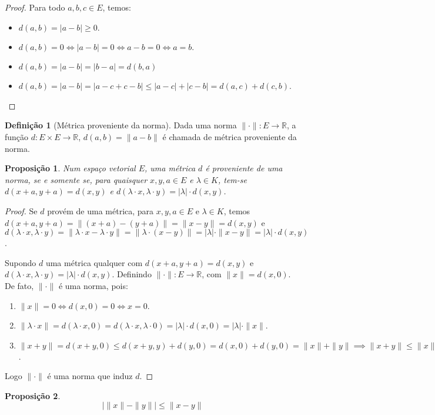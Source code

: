 \documentclass{article}
\theoremstyle{plain}
\newtheorem{prop}{Proposição}[section]
\theoremstyle{definition}
\newtheorem{definicao}{Definição}[section]
\theoremstyle{remark}
\begin{document}
\begin{proof}
	Para todo $a,b,c\in E$, temos:
	\begin{itemize}
		\item $d(a,b) = |a-b| \geq 0 $.
		\item $d(a,b) = 0 \iff |a-b| = 0 \iff a-b = 0 \iff a = b.$
		\item $d(a,b) = |a-b| = |b-a| = d(b,a)$
		\item $d(a,b) =  |a-b|  = |a-c+c-b| \leq |a-c| + |c-b| = d(a,c) + d(c,b)$.
	\end{itemize}
\end{proof}
\begin{definicao}[Métrica proveniente da norma]
	Dada uma norma $\| \cdot \|: E \to \mathbb{R}$, a função $d: E\times E \to \mathbb{R}$, $d(a,b) = \| a-b\|$ é chamada de métrica proveniente da norma.
\end{definicao}
\begin{prop}
	Num espaço vetorial $E$, uma métrica $d$ é proveniente de uma norma, se e somente se,  para quaisquer $x,y,a\in E$ e $\lambda\in K$, tem-se $d(x+a, y+a) = d(x,y)$ e $d(\lambda \cdot x, \lambda \cdot y ) = |\lambda| \cdot d(x,y)$.
\end{prop}
\begin{proof}
	Se $d$ provém de uma métrica, para $x,y, a\in E$ e $\lambda \in K$, temos  $d(x+a,y+a) = \|(x+a) -(y+a) \| = \| x- y\| = d(x,y)$ e $d(\lambda \cdot x, \lambda \cdot y ) = \| \lambda\cdot x  - \lambda \cdot y \| = \| \lambda\cdot (x-y) \| = |\lambda|\cdot \| x-y\| = |\lambda | \cdot d(x,y)$.

	Supondo $d$ uma métrica qualquer com $d(x+a, y+a) = d(x,y)$ e $d(\lambda \cdot x, \lambda \cdot y ) = |\lambda| \cdot d(x,y)$. Definindo $\| \cdot \| : E \to \mathbb{R}$, com $\|x\| = d(x,0)$. De fato, $\| \cdot \| $ é uma norma, pois:
	\begin{enumerate}
		\item $\| x\| = 0 \iff d(x,0) = 0 \iff x =0$.
		\item $\| \lambda \cdot x \| = d(\lambda \cdot x, 0) = d(\lambda \cdot x, \lambda \cdot 0) = |\lambda |\cdot d(x,0) = |\lambda|\cdot \| x\|$.
		\item $\| x+y\| = d(x+y,0) \leq d(x+y, y) + d(y , 0) = d(x,0) + d(y,0) = \| x\| + \|y\| \implies \| x+y \| \leq \|x\| +   \|y\|$.
	\end{enumerate}
	Logo $\|\cdot \|$ é uma norma que induz $d$.
\end{proof}
\begin{prop}
	$$| \| x \| - \| y \| |  \leq  \|  x - y \| $$
\end{prop}
\end{document}
